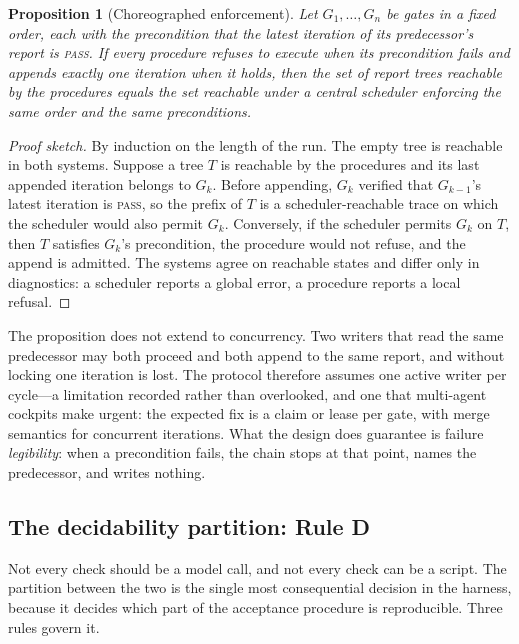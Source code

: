 \documentclass[10pt,a4paper]{article}
\theoremstyle{definition}
\theoremstyle{plain}
\newtheorem{proposition}{Proposition}[section]
\theoremstyle{principle}
\begin{document}
\begin{proposition}[Choreographed enforcement]\label{pr:choreography}
Let $G_1,\dots,G_n$ be gates in a fixed order, each with the precondition that the latest iteration
of its predecessor's report is \textnormal{\textsc{pass}}. If every procedure refuses to execute when its
precondition fails and appends exactly one iteration when it holds, then the set of report trees
reachable by the procedures equals the set reachable under a central scheduler enforcing the same
order and the same preconditions.
\end{proposition}

\begin{proof}[Proof sketch]
By induction on the length of the run. The empty tree is reachable in both systems. Suppose a tree
$T$ is reachable by the procedures and its last appended iteration belongs to $G_k$. Before
appending, $G_k$ verified that $G_{k-1}$'s latest iteration is \textnormal{\textsc{pass}}, so the prefix of $T$
is a scheduler-reachable trace on which the scheduler would also permit $G_k$. Conversely, if the
scheduler permits $G_k$ on $T$, then $T$ satisfies $G_k$'s precondition, the procedure would not
refuse, and the append is admitted. The systems agree on reachable states and differ only in
diagnostics: a scheduler reports a global error, a procedure reports a local refusal.
\end{proof}

The proposition does not extend to concurrency. Two writers that read the same predecessor may
both proceed and both append to the same report, and without locking one iteration is lost. The
protocol therefore assumes one active writer per cycle---a limitation recorded rather than
overlooked, and one that multi-agent cockpits make urgent: the expected fix is a claim or lease per
gate, with merge semantics for concurrent iterations. What the design does guarantee is failure \emph{legibility}: when a precondition
fails, the chain stops at that point, names the predecessor, and writes nothing.

\subsection{The decidability partition: Rule D}\label{sec:ruled}

Not every check should be a model call, and not every check can be a script. The partition between
the two is the single most consequential decision in the harness, because it decides which part of
the acceptance procedure is reproducible. Three rules govern it.
\end{document}

